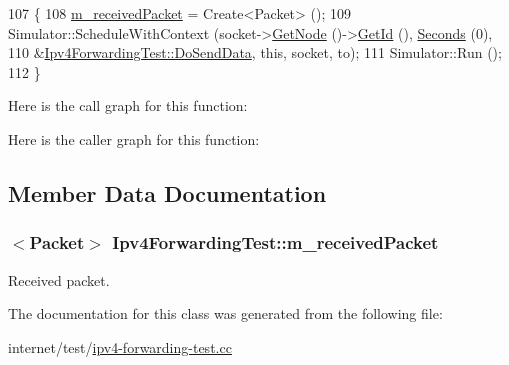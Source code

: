 \begin{DoxyCode}
107 \{
108   \hyperlink{classIpv4ForwardingTest_a141945edb766e36419cb71037dc01017}{m\_receivedPacket} = Create<Packet> ();
109   Simulator::ScheduleWithContext (socket->\hyperlink{classns3_1_1Socket_aba642ad4301c1df47befc0aa9afa2e48}{GetNode} ()->\hyperlink{classns3_1_1Node_aaf49b64a843565ce3812326313b370ac}{GetId} (), 
      \hyperlink{group__timecivil_ga33c34b816f8ff6628e33d5c8e9713b9e}{Seconds} (0),
110                                   &\hyperlink{classIpv4ForwardingTest_a5e8130dfa935063f0a76b6b016ed5afd}{Ipv4ForwardingTest::DoSendData}, \textcolor{keyword}{this}, 
      socket, to);
111   Simulator::Run ();
112 \}
\end{DoxyCode}


Here is the call graph for this function\+:




Here is the caller graph for this function\+:




\subsection{Member Data Documentation}
\subsubsection[{\texorpdfstring{m\+\_\+received\+Packet}{m_receivedPacket}}]{$<${\bf Packet}$>$ Ipv4\+Forwarding\+Test\+::m\+\_\+received\+Packet\hspace{0.3cm}{\ttfamily [private]}}\hypertarget{classIpv4ForwardingTest_a141945edb766e36419cb71037dc01017}{}\label{classIpv4ForwardingTest_a141945edb766e36419cb71037dc01017}


Received packet. 



The documentation for this class was generated from the following file\+:\begin{DoxyCompactItemize}
\item 
internet/test/\hyperlink{ipv4-forwarding-test_8cc}{ipv4-\/forwarding-\/test.\+cc}\end{DoxyCompactItemize}
